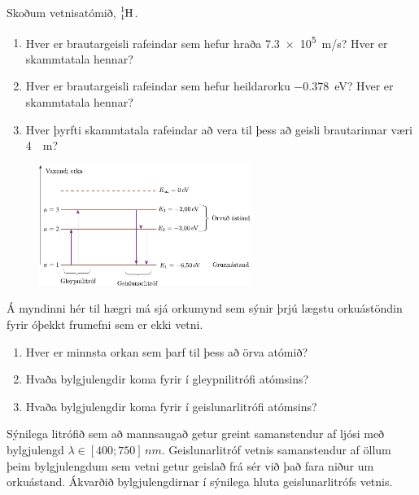 \begin{enumerate}[label = \textbf{(\alph*)}]



\item[\textbf{(38.31)}] Skoðum vetnisatómið, $\ce{^{1}_{1}H}$.
\begin{enumerate}[label = \textbf{(\alph*)}]
    \item Hver er brautargeisli rafeindar sem hefur hraða \SI{7.3e5}{m/s}? Hver er skammtatala hennar?
    \item Hver er brautargeisli rafeindar sem hefur heildarorku \SI{-0.378}{eV}? Hver er skammtatala hennar?
    \item Hver þyrfti skammtatala rafeindar að vera til þess að geisli brautarinnar væri \SI{4}{\mu m}?
\end{enumerate}

\begin{minipage}{\linewidth}
\begin{figure}
\vspace{-0.5cm}
\includegraphics[width = 2.7in]{figures/gleipni.pdf}
\end{figure}

\item[\textbf{(38.56)}] Á myndinni hér til hægri má sjá orkumynd sem sýnir þrjú lægstu orkuástöndin fyrir óþekkt frumefni sem er ekki vetni.
\begin{enumerate}[label = \textbf{(\alph*)}]
    \item Hver er minnsta orkan sem þarf til þess að örva atómið?
    \item Hvaða bylgjulengdir koma fyrir í gleypnilitrófi atómsins?
    \item Hvaða bylgjulengdir koma fyrir í geislunarlitrófi atómsins?
\end{enumerate}

\end{minipage}

\vspace{1cm}

\item[\textbf{(38.59)}] Sýnilega litrófið sem að mannsaugað getur greint samanstendur af ljósi með bylgjulengd $\lambda \in [400; 750] \, \si{nm}$. Geislunarlitróf vetnis samanstendur af öllum þeim bylgjulengdum sem vetni getur geislað frá sér við það fara niður um orkuástand. Ákvarðið bylgjulengdirnar í sýnilega hluta geislunarlitrófs vetnis.



\end{enumerate}
